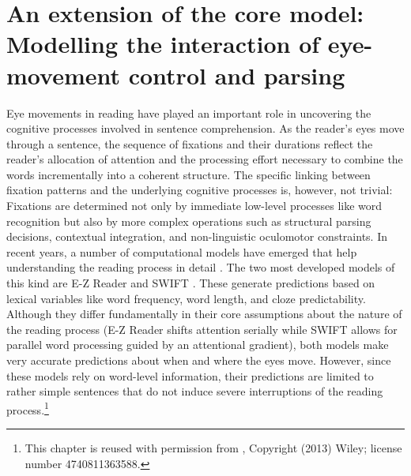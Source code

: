 \chapter[Extension: Eye-movement control and parsing]{An extension of the core model: 
Modelling the interaction of eye-movement control and parsing} \label{c02emma}

Eye movements in reading have played an important role in uncovering the cognitive processes involved in sentence comprehension.  As the reader's eyes move through a sentence, the  sequence of fixations and their durations reflect the reader's allocation of attention and the processing effort necessary to combine the words incrementally into a coherent structure.  The specific linking between fixation patterns and the underlying cognitive processes is, however, not trivial: Fixations are determined not only by immediate low-level processes like word recognition but also by more complex operations such as structural parsing decisions, contextual integration, and non-linguistic oculomotor constraints.  In recent years, a number of computational models have emerged that help understanding the reading process in detail \citep{BicknellLevy2010a,EngbertEtAl2002,Engbert2005,Legge2002,Reichle1998,Nilsson2010,Reichle2006,Reilly2006}.  
The two most developed models of this kind are  E-Z Reader \citep{Reichle2006} and  SWIFT \citep{Engbert2005}.  These generate predictions based on  lexical variables like word frequency, word length, and cloze predictability.  Although they differ fundamentally in their core assumptions about the nature of the reading process (E-Z Reader shifts attention  serially while SWIFT allows for  parallel word processing guided by an attentional gradient), both models make very accurate predictions about when and where the eyes move.  However, since these models rely on word-level information, their predictions are limited to rather simple sentences that do not induce severe interruptions of the reading process.\footnote{This chapter is reused  with permission from \cite{Engelmanna}, Copyright (2013) Wiley; license number 4740811363588.}

